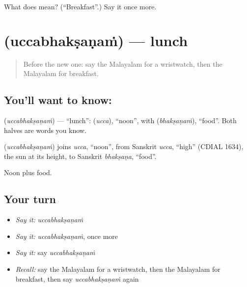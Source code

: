 \begin{tcolorbox}[breakable,colback=teal!4,colframe=teal!35!black,title={Before you move on}]
What does  mean? (\textquotedblleft{}Breakfast\textquotedblright{}.) Say it once more.
\end{tcolorbox}
\section[\texorpdfstring{\ml{ഉച്ചഭക്ഷണം} (uccabhakṣaṇaṁ)}{ഉച്ചഭക്ഷണം (uccabhakṣaṇaṁ)}]{ (uccabhakṣaṇaṁ) — lunch}

\label{lesson:ML-C130-lunch}



\begin{quote}
Before the new one: say the Malayalam for a wristwatch, then the Malayalam for breakfast.
\end{quote}

\subsection*{You'll want to know: }
\textbf{} (\emph{uccabhakṣaṇaṁ}) — \textquotedblleft{}lunch\textquotedblright{}: \textbf{} (\emph{ucca}), \textquotedblleft{}noon\textquotedblright{}, with \textbf{} (\emph{bhakṣaṇaṁ}), \textquotedblleft{}food\textquotedblright{}. Both halves are words you know.

\begin{cousinweb}
\textbf{} (\emph{uccabhakṣaṇaṁ}) joins \emph{ucca}, \textquotedblleft{}noon\textquotedblright{}, from Sanskrit \emph{ucca}, \textquotedblleft{}high\textquotedblright{} (CDIAL 1634), the sun at its height, to Sanskrit \emph{bhakṣaṇa}, \textquotedblleft{}food\textquotedblright{}.
\end{cousinweb}

\begin{grammarlens}[title={What you've built}]
Noon plus food.
\end{grammarlens}

\subsection*{Your turn}
\begin{itemize}
\raggedright
  \item \emph{Say it:} \emph{uccabhakṣaṇaṁ}
  \item \emph{Say it:} \emph{uccabhakṣaṇaṁ}, once more
  \item \emph{Say it:} say \emph{uccabhakṣaṇaṁ}
  \item \emph{Recall:} say the Malayalam for a wristwatch, then the Malayalam for breakfast, then say \emph{uccabhakṣaṇaṁ} again
\end{itemize}

